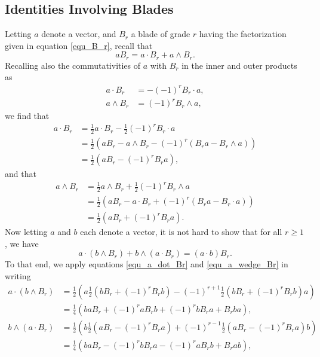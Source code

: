 \documentclass{birkjour}
\theoremstyle{definition}
\theoremstyle{remark}
\numberwithin{equation}{section}
\begin{document}
\subsection{Identities Involving Blades}

Letting $a$ denote a vector, and $B_r$ a blade of grade $r$ having the factorization
given in equation \eqref{equ_B_r}, recall that
\begin{equation}\label{equ_aBr_is_a_dot_Br_and_a_wedge_Br}
aB_r = a\cdot B_r + a\wedge B_r.
\end{equation}
Recalling also the commutativities of $a$ with $B_r$ in the inner and outer products as
\begin{align}
a\cdot B_r &= -(-1)^r B_r\cdot a,\label{equ_a_dot_Br_commutativity} \\
a\wedge B_r &= (-1)^r B_r\wedge a,\label{equ_a_wedge_Br_commutativity}
\end{align}
we find that
\begin{align}
a\cdot B_r &= \frac{1}{2}a\cdot B_r - \frac{1}{2}(-1)^r B_r\cdot a\nonumber \\
 &= \frac{1}{2}(aB_r - a\wedge B_r - (-1)^r(B_ra - B_r\wedge a))\nonumber \\
 &= \frac{1}{2}(aB_r-(-1)^rB_ra),\label{equ_a_dot_Br}
\end{align}
and that
\begin{align}
a\wedge B_r &= \frac{1}{2}a\wedge B_r + \frac{1}{2}(-1)^r B_r\wedge a\nonumber \\
 &= \frac{1}{2}(aB_r - a\cdot B_r + (-1)^r(B_ra - B_r\cdot a))\nonumber \\
 &= \frac{1}{2}(aB_r+(-1)^rB_ra).\label{equ_a_wedge_Br}
\end{align}
Now letting $a$ and $b$ each denote a vector, it is not hard to show that for all $r\geq 1$, we have
\begin{equation}\label{equ_a_dot_b_wedge_Br_identity}
a\cdot(b\wedge B_r) + b\wedge(a\cdot B_r) = (a\cdot b)B_r.
\end{equation}
To that end, we apply equations \eqref{equ_a_dot_Br} and \eqref{equ_a_wedge_Br} in writing
\begin{align*}
a\cdot(b\wedge B_r)
 &= \frac{1}{2}\left(a\frac{1}{2}\left(bB_r + (-1)^rB_rb\right)-(-1)^{r+1}\frac{1}{2}\left(bB_r+(-1)^rB_rb\right)a\right) \\
 &= \frac{1}{4}\left(baB_r + (-1)^raB_rb + (-1)^rbB_ra + B_rba\right), \\
b\wedge(a\cdot B_r)
 &= \frac{1}{2}\left(b\frac{1}{2}\left(aB_r-(-1)^rB_ra\right)+(-1)^{r-1}\frac{1}{2}\left(aB_r-(-1)^rB_ra\right)b\right) \\
 &= \frac{1}{4}\left(baB_r - (-1)^rbB_ra - (-1)^raB_rb + B_rab\right),
\end{align*}
\end{document}
